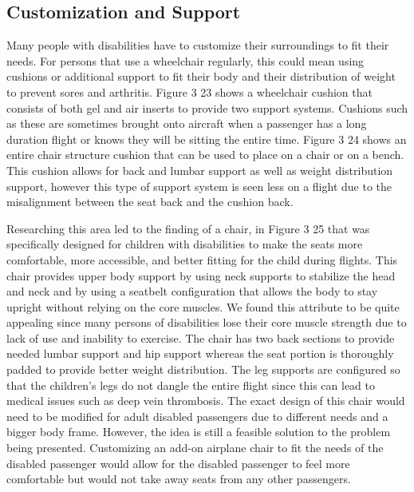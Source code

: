 \subsection{Customization and Support}
Many people with disabilities have to customize their surroundings to fit their needs.  For persons that use a wheelchair regularly, this could mean using cushions or additional support to fit their body and their distribution of weight to prevent sores and arthritis. Figure 3 23 shows a wheelchair cushion that consists of both gel and air inserts to provide two support systems.  Cushions such as these are sometimes brought onto aircraft when a passenger has a long duration flight or knows they will be sitting the entire time.  Figure 3 24 shows an entire chair structure cushion that can be used to place on a chair or on a bench.  This cushion allows for back and lumbar support as well as weight distribution support, however this type of support system is seen less on a flight due to the misalignment between the seat back and the cushion back.  

Researching this area led to the finding of a chair, in Figure 3 25 that was specifically designed for children with disabilities to make the seats more comfortable, more accessible, and better fitting for the child during flights.  This chair provides upper body support by using neck supports to stabilize the head and neck and by using a seatbelt configuration that allows the body to stay upright without relying on the core muscles.  We found this attribute to be quite appealing since many persons of disabilities lose their core muscle strength due to lack of use and inability to exercise.  The chair has two back sections to provide needed lumbar support and hip support whereas the seat portion is thoroughly padded to provide better weight distribution.  The leg supports are configured so that the children's legs do not dangle the entire flight since this can lead to medical issues such as deep vein thrombosis.  The exact design of this chair would need to be modified for adult disabled passengers due to different needs and a bigger body frame.  However, the idea is still a feasible solution to the problem being presented.  Customizing an add-on airplane chair to fit the needs of the disabled passenger would allow for the disabled passenger to feel more comfortable but would not take away seats from any other passengers. 

